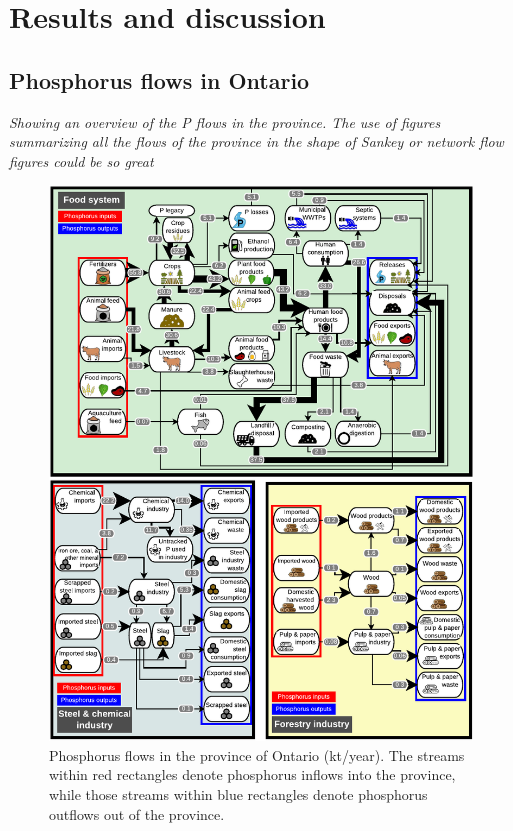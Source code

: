 \documentclass[authoryear]{elsarticle}
\begin{document}
\section{Results and discussion}
\subsection{Phosphorus flows in Ontario}
\emph{\color{red}Showing an overview of the P flows in the province. The use of figures summarizing all the flows of the province in the shape of Sankey or network flow figures could be so great}

\begin{figure}[H]
	\centering
	\includegraphics[width=1\linewidth, trim={0cm 0cm 0cm 0cm},clip]{Figures/Diagram2-3.pdf} 
	\caption{Phosphorus flows in the province of Ontario (kt/year). The streams within red rectangles denote phosphorus inflows into the province, while those streams within blue rectangles denote phosphorus outflows out of the province.}
	\label{fig:FigFlowsSummary}
\end{figure}
\end{document}
